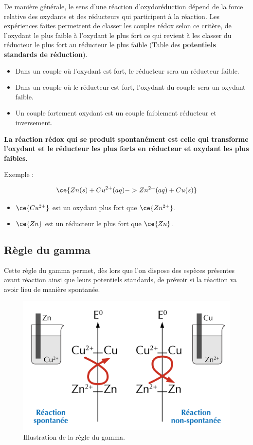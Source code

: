 \documentclass[
  11pt,
  french,
  a4paper,
  openany]{book}
\providecommand{\tightlist}{%
  \setlength{\itemsep}{0pt}\setlength{\parskip}{0pt}}
\begin{document}
De manière générale, le sens d'une réaction d'oxydoréduction dépend de la force relative des oxydants et des réducteurs qui participent à la réaction. Les expériences faites permettent de classer les couples rédox selon ce critère, de l'oxydant le plus faible à l'oxydant le plus fort ce qui revient à les classer du réducteur le plus fort au réducteur le plus faible (Table des \textbf{potentiels standards de réduction}).

\begin{itemize}
\tightlist
\item
  Dans un couple où l'oxydant est fort, le réducteur sera un réducteur faible.
\item
  Dans un couple où le réducteur est fort, l'oxydant du couple sera un oxydant faible.
\item
  Un couple fortement oxydant est un couple faiblement réducteur et inversement.
\end{itemize}

\textbf{La réaction rédox qui se produit spontanément est celle qui transforme l'oxydant et le réducteur les plus forts en réducteur et oxydant les plus faibles.}

Exemple :

\[
\ce{Zn(s) + Cu^{2+}(aq) -> Zn^{2+}(aq) + Cu(s)}
\]

\begin{itemize}
\tightlist
\item
  \(\ce{Cu^{2+}}\) est un oxydant plus fort que \(\ce{Zn^{2+}}\).
\item
  \(\ce{Zn}\) est un réducteur le plus fort que \(\ce{Zn}\).
\end{itemize}

\hypertarget{ruxe8gle-du-gamma}{%
\subsection{Règle du gamma}\label{ruxe8gle-du-gamma}}

Cette règle du gamma permet, dès lors que l'on dispose des espèces présentes avant réaction ainsi que leurs potentiels standards, de prévoir si la réaction va avoir lieu de manière spontanée.

\begin{figure}

{\centering \includegraphics[width=0.45\linewidth]{images/gamma-rule} 

}

\caption{Illustration de la règle du gamma.}\label{fig:gamma-rule}
\end{figure}
\end{document}

